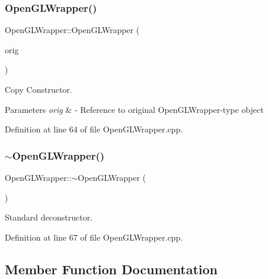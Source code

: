 \subsubsection{\texorpdfstring{OpenGLWrapper()}{OpenGLWrapper()}\hspace{0.1cm}{\footnotesize\ttfamily [3/3]}}
{\footnotesize\ttfamily Open\+G\+L\+Wrapper\+::\+Open\+G\+L\+Wrapper (\begin{DoxyParamCaption}\item[{const \mbox{\hyperlink{classOpenGLWrapper}{Open\+G\+L\+Wrapper}} \&}]{orig }\end{DoxyParamCaption})}



Copy Constructor. 


\begin{DoxyParams}{Parameters}
{\em orig} & -\/ Reference to original Open\+G\+L\+Wrapper-\/type object \\
\hline
\end{DoxyParams}


Definition at line 64 of file Open\+G\+L\+Wrapper.\+cpp.

\mbox{\label{classOpenGLWrapper_aeb3efd8a1f2990c48a16ca85e203025e}} 
\subsubsection{\texorpdfstring{$\sim$OpenGLWrapper()}{~OpenGLWrapper()}}
{\footnotesize\ttfamily Open\+G\+L\+Wrapper\+::$\sim$\+Open\+G\+L\+Wrapper (\begin{DoxyParamCaption}{ }\end{DoxyParamCaption})\hspace{0.3cm}{\ttfamily [virtual]}}

Standard deconstructor. 

Definition at line 67 of file Open\+G\+L\+Wrapper.\+cpp.



\subsection{Member Function Documentation}
\mbox{\label{classOpenGLWrapper_a0c878818b04f78dd90e44dfed481ccab}} 
